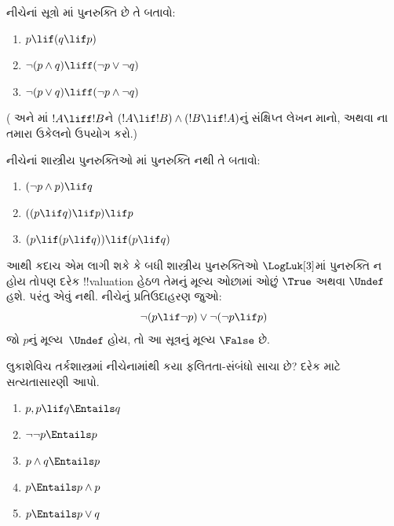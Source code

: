 \documentclass[../../../include/open-logic-section]{subfiles}
\begin{document}
\begin{prob}
  નીચેનાં સૂત્રો \LogLuk[3]માં પુનરુક્તિ છે તે બતાવો:
  \begin{enumerate}
    \item $p \lif (q \lif p)$
    \item\label{mvl:thr:luk:prob:luk-taut-2} $\lnot(p \land q) \liff (\lnot p \lor \lnot q)$
    \item\label{mvl:thr:luk:prob:luk-taut-3} $\lnot(p \lor q) \liff (\lnot p \land \lnot q)$
  \end{enumerate}
  ( અને
  માં $!A \liff !B$ને
  $(!A \lif !B) \land (!B \lif !A)$નું સંક્ષિપ્ત લેખન માનો,
  અથવા ના તમારા ઉકેલનો ઉપયોગ કરો.)
\end{prob}

\begin{prob}
  નીચેનાં શાસ્ત્રીય પુનરુક્તિઓ \LogLuk[3]માં પુનરુક્તિ નથી તે બતાવો:
  \begin{enumerate}
    \item $(\lnot p \land p) \lif q$
    \item $((p \lif q) \lif p) \lif p$
    \item $(p \lif (p \lif q)) \lif (p \lif q)$
  \end{enumerate}
\end{prob}

આથી કદાચ એમ લાગી શકે કે બધી શાસ્ત્રીય પુનરુક્તિઓ
$\LogLuk[3]$માં પુનરુક્તિ ન હોય તોપણ દરેક
!!{valuation} હેઠળ તેમનું મૂલ્ય ઓછામાં ઓછું $\True$ અથવા
$\Undef$ હશે. પરંતુ એવું નથી. નીચેનું પ્રતિઉદાહરણ જુઓ:
\[
  \lnot(p \lif \lnot p) \lor \lnot(\lnot p \lif p)
\]
જો $p$નું મૂલ્ય~$\Undef$ હોય, તો આ સૂત્રનું મૂલ્ય $\False$ છે.

\begin{prob}
  લુકાશેવિચ તર્કશાસ્ત્રમાં નીચેનામાંથી કયા ફલિતતા-સંબંધો સાચા છે?
  દરેક માટે સત્યતાસારણી આપો.
  \begin{enumerate}
    \item $p, p \lif q \Entails q$
    \item $\lnot\lnot p \Entails p$
    \item $p \land q \Entails p$
    \item $p \Entails p \land p$
    \item $p \Entails p \lor q$
  \end{enumerate}
\end{prob}
\end{document}
